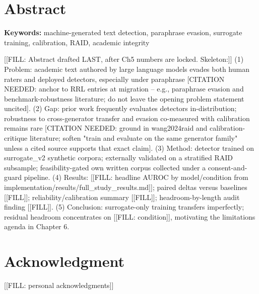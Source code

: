 \documentclass[12pt,a4paper]{report}
\begin{document}
\chapter*{Abstract}
\noindent\textbf{Keywords:} machine-generated text detection, paraphrase
evasion, surrogate training, calibration, RAID, academic integrity

[[FILL: Abstract drafted LAST, after Ch5 numbers are locked. Skeleton:]]
(1) Problem: academic text authored by large language models evades both
human raters and deployed detectors, especially under paraphrase
[CITATION NEEDED: anchor to RRL entries at migration -- e.g., paraphrase
evasion and benchmark-robustness literature; do not leave the opening
problem statement uncited].
(2) Gap: prior work frequently evaluates detectors in-distribution;
robustness to cross-generator transfer and evasion co-measured with
calibration remains rare [CITATION NEEDED: ground in wang2024raid and
calibration-critique literature; soften "train and evaluate on the same
generator family" unless a cited source supports that exact claim].
(3) Method: detector trained on surrogate\_v2 synthetic corpora; externally
validated on a stratified RAID subsample; feasibility-gated own written
corpus collected under a consent-and-guard pipeline.
(4) Results: [[FILL: headline AUROC by model/condition from
implementation/results/full\_study\_results.md]]; paired deltas versus
baselines [[FILL]]; reliability/calibration summary [[FILL]];
headroom-by-length audit finding [[FILL]].
(5) Conclusion: surrogate-only training transfers imperfectly; residual
headroom concentrates on [[FILL: condition]], motivating the limitations
agenda in Chapter 6.

\chapter*{Acknowledgment}
[[FILL: personal acknowledgments]]

\tableofcontents
\listoftables
\listoffigures

\cleardoublepage
{}

%
\end{document}
